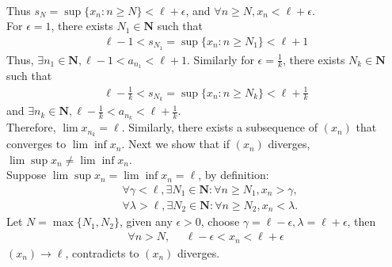 \documentclass[12pt]{report}
\begin{document}
\begin{enumerate}[label=(\alph*)]
{\begin{align*}
    \end{align*}
    Thus $s_N = \sup\{x_n: n\geq N\}<\ell+\epsilon$, and $\forall n \geq N, x_n<\ell+\epsilon$.\\
    For $\epsilon=1$, there exists $N_1 \in\mathbf{N}$ such that
    \begin{align*}
        \ell-1 < s_{N_1} = \sup\{x_n:n \geq N_1\}<\ell+1
    \end{align*}
    Thus, $\exists n_1\in \mathbf{N}, \ell-1<a_{n_1}<\ell+1$. Similarly for $\epsilon = \frac{1}{k}$,
    there exists $N_k \in\mathbf{N}$ such that
    \begin{align*}
        \ell-\frac{1}{k} < s_{N_k} = \sup\{x_n:n \geq N_k\}<\ell+\frac{1}{k}
    \end{align*}
    and $\exists n_k\in \mathbf{N}, \ell-\frac{1}{k}<a_{n_k}<\ell+\frac{1}{k}$.\\
    Therefore, $\lim x_{n_k} = \ell$. Similarly, there exists a subsequence of $(x_n)$ that converges to $\lim \inf x_n$.
    Next we show that if $(x_n)$ diverges,  $\lim \sup x_n \neq \lim \inf x_n$.\\
    Suppose $\lim \sup x_n = \lim \inf x_n = \ell$, by definition:
    \begin{align*}
        &\forall \gamma < \ell, \exists N_1 \in \mathbf{N}: \forall n \geq N_1, x_n > \gamma,\\
        &\forall \lambda >\ell, \exists N_2 \in \mathbf{N}: \forall n \geq N_2, x_n < \lambda. 
    \end{align*}
    Let $N = \max\{N_1,N_2\}$, given any $\epsilon>0$, choose $\gamma = \ell-\epsilon, \lambda=\ell+\epsilon$, then
    \begin{align*}
        \forall n>N, \text{~~~~} \ell-\epsilon<x_n<\ell+\epsilon
    \end{align*}
    $(x_n)\to \ell$, contradicts to $(x_n)$ diverges.\\
    \fi

}
\end{enumerate}
\end{document}
